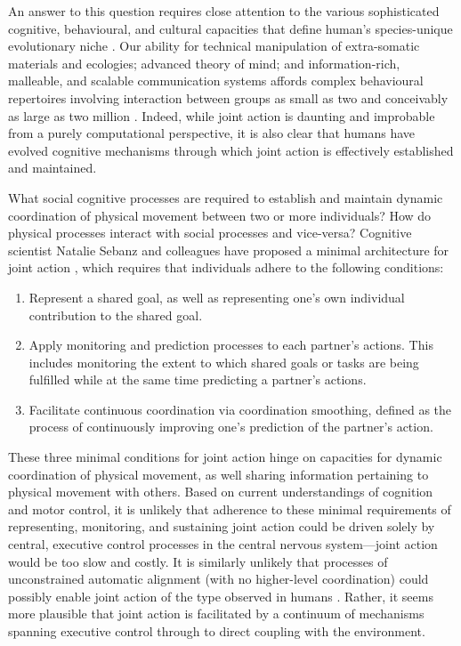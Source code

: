\begin{CJK}{UTF8}{gbsn}
An answer to this question requires close attention to the various sophisticated cognitive, behavioural, and cultural capacities that define human's species-unique evolutionary niche \citep{Roepstorff2010,Clark2015,Fuentes2016}.  Our ability for technical manipulation of extra-somatic materials and ecologies; advanced theory of mind; and information-rich, malleable, and scalable communication systems affords complex behavioural repertoires involving interaction between groups as small as two and conceivably as large as two million \citep{Pacherie2012,Nowak2017}.  Indeed, while joint action is daunting and improbable from a purely computational perspective, it is also clear that humans have evolved cognitive mechanisms through which joint action is effectively established and maintained.

What social cognitive processes are required to establish and maintain dynamic coordination of physical movement between two or more individuals? How do physical processes interact with social processes and vice-versa?  Cognitive scientist Natalie Sebanz and colleagues have proposed a minimal architecture for joint action \citep{Sebanz2006,Vesper2010}, which requires that individuals adhere to the following conditions:

\begin{enumerate}
  \item Represent a shared goal, as well as representing one’s own individual contribution to the shared goal.
  \item Apply monitoring and prediction processes to each partner’s actions. This includes monitoring the extent to which shared goals or tasks are being fulfilled while at the same time predicting a partner’s actions.
  \item Facilitate continuous coordination via coordination smoothing, defined as the process of continuously improving one’s prediction of the partner’s action.
\end{enumerate}

These three minimal conditions for joint action hinge on capacities for dynamic coordination of physical movement, as well sharing information pertaining to physical movement with others.  Based on current understandings of cognition and motor control, it is unlikely that adherence to these minimal requirements of representing, monitoring, and sustaining joint action could be driven solely by central, executive control processes in the central nervous system---joint action would be too slow and costly.  It is similarly unlikely that processes of unconstrained automatic alignment (with no higher-level coordination) could possibly enable joint action of the type observed in humans \citep{Fusaroli2014}.  Rather, it seems more plausible that joint action is facilitated by a continuum of mechanisms spanning executive control through to direct coupling with the environment.


\end{CJK}
